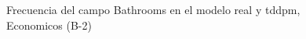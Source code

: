 \begin{figure}[H]
    \centering
    
    \caption{Frecuencia del campo Bathrooms en el modelo real y tddpm, Economicos (B-2)}
    \label{frecuency-Bathrooms-tddpm_mlp}
\end{figure}